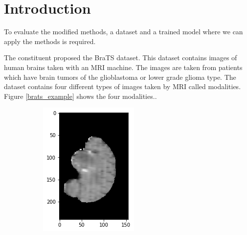 \section{Introduction}
To evaluate the modified methods, a dataset and a trained model where we can apply the methods is required.

The constituent proposed the BraTS \cite{menze2015multimodal} dataset. This dataset contains
images of human brains taken with an MRI machine. The images are taken from patients which have brain tumors of the glioblastoma or lower grade glioma type. The dataset contains four different types of images taken by MRI called modalities. Figure \ref{brats_example} shows the four modalities..

\begin{figure}[H]
    \centering
    \begin{subfigure}{.2\textwidth}
        \centering
        \includegraphics[width=\linewidth]{chapters/04_segmentation/images/brats/0.png}

\end{subfigure}
\end{figure}
